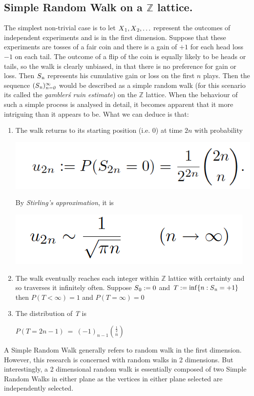 \documentclass{article}
\begin{document}
\subsection{Simple Random Walk on a $\mathbb{Z}$ lattice.} 
	The simplest non-trivial case is to let $X\textsubscript{1}, X\textsubscript{2}, \ldots$ represent the outcomes of independent experiments and is in the first dimension. Suppose that these experiments are tosses of a fair coin and  there is a gain of $+1$ for each head loss $-1$ on each tail. The outcome of a flip of the coin is equally likely to be heads or tails, so the walk is clearly unbiased, in that there is no preference for gain or loss. Then $S\textsubscript{n}$ represents his cumulative gain or loss on the first $n$ plays.
Then the sequence $(S\textsubscript{n})_\emph{n=0}^\infty$ would be described as a simple random walk (for this  scenario its called the \emph{gambler\' s ruin estimate}) on the $\mathbb{Z}$ lattice. When the behaviour of such a simple process is analysed in detail, it becomes apparent that it more intriguing than it appears to be. What we can deduce is that:
	\begin{enumerate}
	\item The walk returns to its starting position (i.e. 0) at time $2n$ with probability
		\begin{center}
			\includegraphics[scale=0.8]{WalkReturnToStartT2nProbability}
		\end{center}
		By \emph{Stirling's approximation}, it is
		\begin{center}
			\includegraphics[scale=0.8]{WalkReturnToStartTnProbability}
			\cite{Durrett2010}
		\end{center}
	\item The walk eventually reaches each integer within $\mathbb{Z}$ lattice with certainty and so traverses it infinitely often. Suppose $S\textsubscript{0} := 0$ and $T := \inf\{n : S\textsubscript{n} = +1\}$ then $P(T < \infty) = 1$ and $P(T =  \infty) = 0$
	\item The distribution of \emph{T} is 
		\begin{center}
			$P(T = 2n - 1)\ =\ (-1)_{n-1}\binom{\frac{1}{2}}{n}$
		\end{center}
	\end{enumerate}
A Simple Random Walk generally refers to random walk in the first dimension. However, this research is concerned with random walks in 2 dimensions. But interestingly, a 2 dimensional random walk is essentially  composed of two Simple Random Walks in either plane as the vertices in either plane selected are independently selected.
\newline
\end{document}
